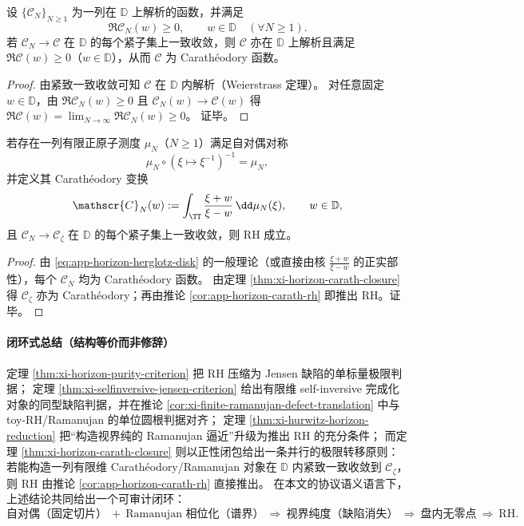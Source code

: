 \begin{theorem}\label{thm:xi-horizon-carath-closure}
设 \(\{\mathscr{C}_N\}_{N\ge 1}\) 为一列在 \(\mathbb{D}\) 上解析的函数，并满足
\[
\Re \mathscr{C}_N(w)\ge 0,\qquad w\in\mathbb{D}\quad(\forall N\ge 1).
\]
若 \(\mathscr{C}_N\to \mathscr{C}\) 在 \(\mathbb{D}\) 的每个紧子集上一致收敛，则 \(\mathscr{C}\) 亦在 \(\mathbb{D}\) 上解析且满足 \(\Re \mathscr{C}(w)\ge 0\)（\(w\in\mathbb{D}\)），从而 \(\mathscr{C}\) 为 Carath\'eodory 函数。
\end{theorem}

\begin{proof}
由紧致一致收敛可知 \(\mathscr{C}\) 在 \(\mathbb{D}\) 内解析（Weierstrass 定理）。
对任意固定 \(w\in\mathbb{D}\)，由 \(\Re \mathscr{C}_N(w)\ge 0\) 且 \(\mathscr{C}_N(w)\to \mathscr{C}(w)\) 得 \(\Re \mathscr{C}(w)=\lim_{N\to\infty}\Re \mathscr{C}_N(w)\ge 0\)。
证毕。
\end{proof}

\begin{corollary}[有限维 Ramanujan 证书序列 \texorpdfstring{$\Rightarrow$}{=>} RH 的可审计路线]\label{cor:xi-finite-ramanujan-carath-implies-rh}
若存在一列有限正原子测度 \(\mu_N\)（\(N\ge 1\)）满足自对偶对称
\[
\mu_N\circ(\xi\mapsto\xi^{-1})^{-1}=\mu_N,
\]
并定义其 Carath\'eodory 变换
\[
\mathscr{C}_N(w):=\int_{\TT}\frac{\xi+w}{\xi-w}\,\dd\mu_N(\xi),\qquad w\in\mathbb{D},
\]
且 \(\mathscr{C}_N\to \mathscr{C}_{\zeta}\) 在 \(\mathbb{D}\) 的每个紧子集上一致收敛，则 RH 成立。
\end{corollary}

\begin{proof}
由 \eqref{eq:app-horizon-herglotz-disk} 的一般理论（或直接由核 \(\frac{\xi+w}{\xi-w}\) 的正实部性），每个 \(\mathscr{C}_N\) 均为 Carath\'eodory 函数。
由定理 \ref{thm:xi-horizon-carath-closure} 得 \(\mathscr{C}_{\zeta}\) 亦为 Carath\'eodory；再由推论 \ref{cor:app-horizon-carath-rh} 即推出 RH。证毕。
\end{proof}

\paragraph{闭环式总结（结构等价而非修辞）}
定理 \ref{thm:xi-horizon-purity-criterion} 把 RH 压缩为 Jensen 缺陷的单标量极限判据；
定理 \ref{thm:xi-selfinversive-jensen-criterion} 给出有限维 self-inversive 完成化对象的同型缺陷判据，并在推论 \ref{cor:xi-finite-ramanujan-defect-translation} 中与 toy-RH/Ramanujan 的单位圆根判据对齐；
定理 \ref{thm:xi-hurwitz-horizon-reduction} 把“构造视界纯的 Ramanujan 逼近”升级为推出 RH 的充分条件；
而定理 \ref{thm:xi-horizon-carath-closure} 则以正性闭包给出一条并行的极限转移原则：若能构造一列有限维 Carath\'eodory/Ramanujan 对象在 \(\mathbb{D}\) 内紧致一致收敛到 \(\mathscr{C}_{\zeta}\)，则 RH 由推论 \ref{cor:app-horizon-carath-rh} 直接推出。
在本文的协议语义语言下，上述结论共同给出一个可审计闭环：
\[
\text{自对偶（固定切片）}\ +\ \text{Ramanujan 相位化（谱界）}
\ \Longrightarrow\ 
\text{视界纯度（缺陷消失）}
\ \Longrightarrow\ 
\text{盘内无零点}
\ \Longrightarrow\ 
\text{RH}.
\]
\endinput
